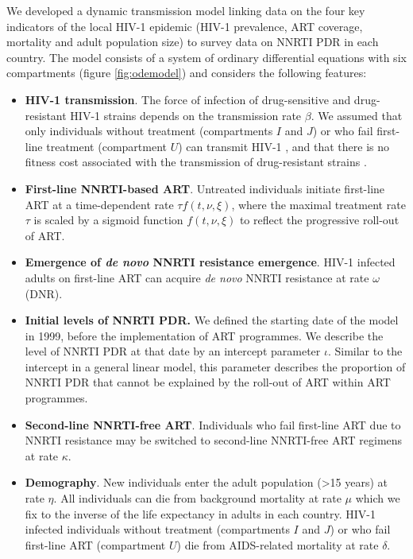\documentclass{article}
\begin{document}
We developed a dynamic transmission model linking data on the four key indicators of the local HIV-1 epidemic (HIV-1 prevalence, ART coverage, mortality and adult population size) to survey data on NNRTI PDR in each country. 
The model consists of a system of ordinary differential equations with six compartments (figure \ref{fig:odemodel}) and considers the following features:

\begin{itemize}
\item \textbf{HIV-1 transmission}.
The force of infection of drug-sensitive and drug-resistant HIV-1 strains depends on the transmission rate $\beta$. We assumed that only individuals without treatment (compartments $I$ and $J$) or who fail first-line treatment (compartment $U$) can transmit HIV-1 \cite{supervie2014heterosexual}, and that there is no fitness cost associated with the transmission of drug-resistant strains \cite{little2008persistence}.

\item \textbf{First-line NNRTI-based ART}.
Untreated individuals initiate first-line ART at a time-dependent rate $\tau f(t,\nu,\xi)$, where the maximal treatment rate $\tau$ is scaled by a sigmoid function $f(t,\nu,\xi)$ to reflect the progressive roll-out of ART.

\item \textbf{Emergence of \emph{de novo} NNRTI resistance emergence}. 
HIV-1 infected adults on first-line ART can acquire \emph{de novo} NNRTI resistance at rate $\omega$ (DNR).

\item \textbf{Initial levels of NNRTI PDR.} We defined the starting date of the model in 1999, before the implementation of ART programmes. We describe the level of NNRTI PDR at that date by an intercept parameter $\iota$. Similar to the intercept in a general linear model, this parameter describes the proportion of NNRTI PDR that cannot be explained by the roll-out of ART within ART programmes. 

\item \textbf{Second-line NNRTI-free ART}. 
Individuals who fail first-line ART due to NNRTI resistance may be switched to second-line NNRTI-free ART regimens at rate $\kappa$.

\item \textbf{Demography}.
New individuals enter the adult population (>15 years) at rate $\eta$. 
All individuals can die from background mortality at rate $\mu$ which we fix to the inverse of the life expectancy in adults in each country. HIV-1 infected individuals without treatment (compartments $I$ and $J$) or who fail first-line ART (compartment $U$) die from AIDS-related mortality at rate $\delta$.
\end{itemize}
\end{document}
